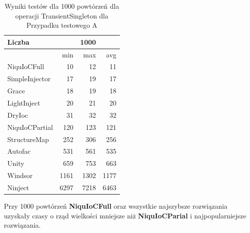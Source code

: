 \documentclass[12pt]{article}
\begin{document}
\begin{table}[H]
\captionsetup{belowskip=0pt,aboveskip=0pt}
\begin{center}
\begin{small}
	\begin{tabular}{ | l | r r r | }
    		\hline
Liczba & & 1000 & \\ \hline
 & min & max & avg \\ \hline
NiquIoCFull & 10 & 12 & 11 \\ \hline
SimpleInjector & 17 & 19 & 17 \\ \hline
Grace & 18 & 19 & 18 \\ \hline
LightInject & 20 & 21 & 20 \\ \hline
DryIoc & 31 & 32 & 32 \\ \hline
NiquIoCPartial & 120 & 123 & 121 \\ \hline
StructureMap & 252 & 306 & 256 \\ \hline
Autofac & 531 & 561 & 535 \\ \hline
Unity & 659 & 753 & 663 \\ \hline
Windsor & 1161 & 1302 & 1177 \\ \hline
Ninject & 6297 & 7218 & 6463 \\ \hline
  	\end{tabular}
\end{small}
\end{center}
\caption{Wyniki testów dla 1000 powtórzeń dla operacji TransientSingleton dla Przypadku testowego A}
\label{TestCaseA_TransientSingleton1000}
\end{table}
Przy 1000 powtórzeń \textbf{NiquIoCFull} oraz wszystkie najszybsze rozwiązania uzyskały czasy o rząd wielkości mniejsze niż \textbf{NiquIoCParial} i najpopularniejsze rozwiązania.
\end{document}
